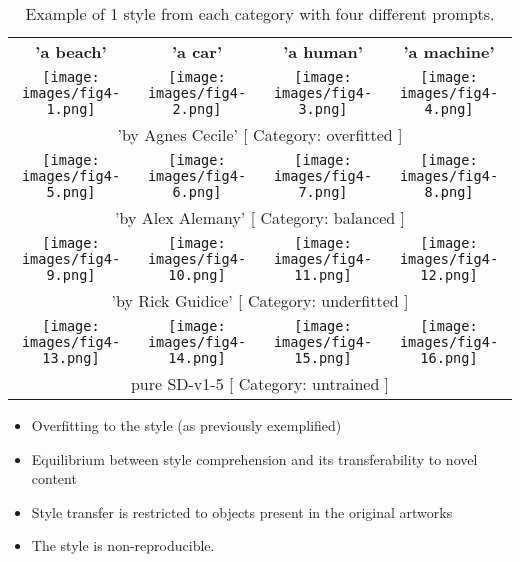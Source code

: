 \documentclass[12pt, letterpaper]{article}
\begin{document}
\begin{table}[h!]
    \centering
    \begin{tabularx}{\textwidth}{cccc}
        \textbf{'a beach'} & \textbf{'a car'} & \textbf{'a human'} & \textbf{'a machine'} \\
        \texttt{[image: images/fig4-1.png]} & \texttt{[image: images/fig4-2.png]} & \texttt{[image: images/fig4-3.png]} & \texttt{[image: images/fig4-4.png]} \\
        \multicolumn{4}{c}{'by Agnes Cecile' [ Category: overfitted ]} \\
        \texttt{[image: images/fig4-5.png]} & \texttt{[image: images/fig4-6.png]} & \texttt{[image: images/fig4-7.png]} & \texttt{[image: images/fig4-8.png]} \\
        \multicolumn{4}{c}{'by Alex Alemany' [ Category: balanced ]} \\
        \texttt{[image: images/fig4-9.png]} & \texttt{[image: images/fig4-10.png]} & \texttt{[image: images/fig4-11.png]} & \texttt{[image: images/fig4-12.png]} \\
        \multicolumn{4}{c}{'by Rick Guidice' [ Category: underfitted ]} \\
        \texttt{[image: images/fig4-13.png]} & \texttt{[image: images/fig4-14.png]} & \texttt{[image: images/fig4-15.png]} & \texttt{[image: images/fig4-16.png]} \\
        \multicolumn{4}{c}{pure SD-v1-5 [ Category: untrained ]} \\
    \end{tabularx}
    \caption{Example of 1 style from each category with four different prompts.}
    \label{tab:table_2}
\end{table}

\begin{itemize}
    \item Overfitting to the style (as previously exemplified)
    \item Equilibrium between style comprehension and its transferability to novel content
    \item Style transfer is restricted to objects present in the original artworks
    \item The style is non-reproducible.
\end{itemize}
\end{document}
